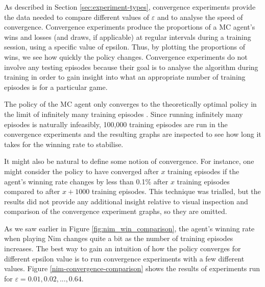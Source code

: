 \documentclass[11pt,a4paper]{report}
\begin{document}
As described in Section \ref{sec:experiment-types}, convergence experiments provide the data needed to compare different values of $\varepsilon$ and to analyse the speed of convergence. Convergence experiments produce the proportions of a MC agent's wins and losses (and draws, if applicable) at regular intervals during a training session, using a specific value of epsilon. Thus, by plotting the proportions of wins, we see how quickly the policy changes. Convergence experiments do not involve any testing episodes because their goal is to analyse the algorithm during training in order to gain insight into what an appropriate number of training episodes is for a particular game.

The policy of the MC agent only converges to the theoretically optimal policy in the limit of infinitely many training episodes \cite{rl-book}. Since running infinitely many episodes is naturally infeasibly, 100,000 training episodes are run in the convergence experiments and the resulting graphs are inspected to see how long it takes for the winning rate to stabilise.

It might also be natural to define some notion of convergence. For instance, one might consider the policy to have converged after $x$ training episodes if the agent's winning rate changes by less than 0.1\% after $x$ training episodes compared to after $x+1000$ training episodes. This technique was trialled, but the results did not provide any additional insight relative to visual inspection and comparison of the convergence experiment graphs, so they are omitted.

As we saw earlier in Figure \ref{fig:nim_win_comparison}, the agent's winning rate when playing Nim changes quite a bit as the number of training episodes increases. The best way to gain an intuition of how the policy converges for different epsilon value is to run convergence experiments with a few different values. Figure \ref{nim-convergence-comparison} shows the results of experiments run for $\varepsilon = 0.01, 0.02,..., 0.64$.
\end{document}
